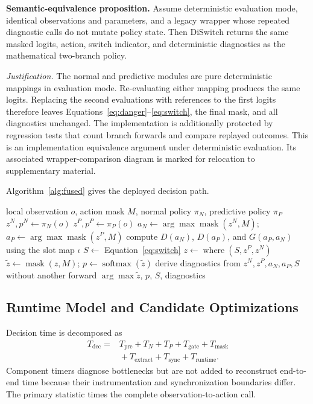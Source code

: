 \documentclass{ieeeaccess}
\newcommand{\DS}{DiSwitch}
\begin{document}
\textbf{Semantic-equivalence proposition.} Assume deterministic evaluation mode, identical observations and parameters, and a legacy wrapper whose repeated diagnostic calls do not mutate policy state. Then \DS{} returns the same masked logits, action, switch indicator, and deterministic diagnostics as the mathematical two-branch policy.

\textit{Justification.} The normal and predictive modules are pure deterministic mappings in evaluation mode. Re-evaluating either mapping produces the same logits. Replacing the second evaluations with references to the first logits therefore leaves Equations~\eqref{eq:danger}--\eqref{eq:switch}, the final mask, and all diagnostics unchanged. The implementation is additionally protected by regression tests that count branch forwards and compare replayed outcomes. This is an implementation equivalence argument under deterministic evaluation. Its associated wrapper-comparison diagram is marked for relocation to supplementary material.

Algorithm~\ref{alg:fused} gives the deployed decision path.

\begin{algorithm*}[t]
\caption{DiSwitch decision}\label{alg:fused}
\begin{algorithmic}[1]
\Require local observation $o$, action mask $M$, normal policy $\pi_N$, predictive policy $\pi_P$
\State $z^N,p^N\gets\pi_N(o)$ 
\State $z^P,p^P\gets\pi_P(o)$ 
\State $a_N\gets\arg\max \operatorname{mask}(z^N,M)$; $a_P\gets\arg\max \operatorname{mask}(z^P,M)$
\State compute $D(a_N)$, $D(a_P)$, and $G(a_P,a_N)$ using the slot map $\iota$
\State $S\gets$ Equation~\eqref{eq:switch}
\State $z\gets\operatorname{where}(S,z^P,z^N)$
\State $\tilde z\gets\operatorname{mask}(z,M)$; $p\gets\operatorname{softmax}(\tilde z)$
\State derive diagnostics from $z^N,z^P,a_N,a_P,S$ without another forward
\State \Return $\arg\max\tilde z$, $p$, $S$, diagnostics
\end{algorithmic}
\end{algorithm*}

\subsection{Runtime Model and Candidate Optimizations}

Decision time is decomposed as
\begin{equation}
\begin{aligned}
T_{\mathrm{dec}}={}&T_{\mathrm{pre}}+T_N+T_P+T_{\mathrm{gate}}+T_{\mathrm{mask}}\\
&{}+T_{\mathrm{extract}}+T_{\mathrm{sync}}+T_{\mathrm{runtime}}.
\end{aligned}
\end{equation}
Component timers diagnose bottlenecks but are not added to reconstruct end-to-end time because their instrumentation and synchronization boundaries differ. The primary statistic times the complete observation-to-action call.
\end{document}

